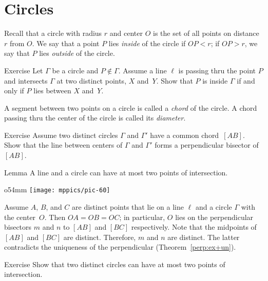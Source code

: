\section{Circles}

Recall that a circle with radius $r$ and center $O$ is the set of all points on distance $r$ from $O$.
We say that a point $P$ lies \emph{inside} of the circle if $OP<r$; 
if $OP>r$, we say that $P$ lies \emph{outside} of the circle.
\label{def:circle}

\begin{thm}{Exercise}\label{ex:inside-outside}
Let $\Gamma$ be a circle and $P\notin \Gamma$.
Assume a line $\ell$ is passing thru the point $P$
and intersects $\Gamma$ at two distinct points, $X$ and~$Y$.
Show that $P$ is inside $\Gamma$ if and only if $P$ lies between $X$ and~$Y$.
\end{thm}


A segment between two points on a circle is called a \emph{chord} of the circle.
A chord passing thru the center of the circle is called its \emph{diameter}.

\begin{thm}{Exercise}\label{ex:chord-perp}
Assume two distinct circles $\Gamma$ and $\Gamma'$ have a common chord~$[A B]$.
Show that the line between centers of $\Gamma$ and $\Gamma'$ forms a perpendicular bisector of~$[A B]$.
\end{thm}



\begin{thm}[\abs]{Lemma}\label{lem:line-circle}
A line and a circle can have at most two points of intersection.
\end{thm}

\begin{wrapfigure}{o}{54mm}
\vskip-4mm
\centering
\texttt{[image: mppics/pic-60]}
\end{wrapfigure}

 Assume $A$, $B$, and $C$ are distinct points that lie on a line $\ell$ and a circle $\Gamma$ with the center~$O$.
Then $OA=OB=OC$; in particular, $O$ lies on the perpendicular bisectors 
$m$ and $n$ to $[A B]$ and $[B C]$ respectively.
Note that the midpoints of $[AB]$ and $[BC]$ are distinct.
Therefore, $m$ and $n$ are distinct.
The latter contradicts the uniqueness of the perpendicular (Theorem~\ref{perp:ex+un}).
\qeds

\begin{thm}{Exercise}\label{ex:two-circ}
Show that two distinct circles can have at most two points of intersection.
\end{thm}


